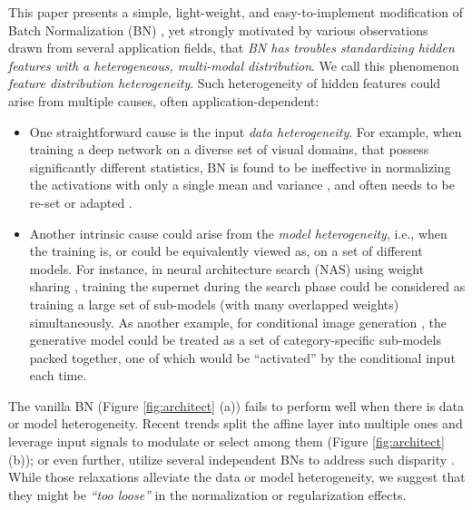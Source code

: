 \documentclass{article}
\begin{document}
This paper presents a simple, light-weight, and easy-to-implement modification of Batch Normalization (BN) \citep{ioffe2015batch}, yet strongly motivated by various observations \citep{zajkac2019split,deecke2018mode,xie2019adversarial,xie2019intriguing} drawn from several application fields, that \textit{BN has troubles standardizing hidden features with a heterogeneous, multi-modal distribution}. We call this phenomenon \textit{feature distribution heterogeneity}. Such heterogeneity of hidden features could arise from multiple causes, often application-dependent:\vspace{-1em}
\begin{itemize}[leftmargin=*]
    \item One straightforward cause is the input \textit{data heterogeneity}. For example, when training a deep network on a diverse set of visual domains, that possess significantly different statistics, BN is found to be ineffective in normalizing the activations with only a single mean and variance \citep{deecke2018mode}, and often needs to be re-set or adapted \citep{li2016revisiting}.\vspace{-0.5em}
    \item Another intrinsic cause could arise from the \textit{model heterogeneity}, i.e., when the training is, or could be equivalently viewed as, on a set of different models. For instance, in neural architecture search (NAS) using weight sharing \citep{liu2018darts,dong2019searching}, training the supernet during the search phase could be considered as training a large set of sub-models (with many overlapped weights) simultaneously. As another example, for conditional image generation \citep{miyato2018spectral}, the generative model could be treated as a set of category-specific sub-models packed together, one of which would be ``activated'' by the conditional input each time.\vspace{-1em}
\end{itemize}
The vanilla BN (Figure \ref{fig:architect} (a)) fails to perform well when there is data or model heterogeneity. Recent trends split the affine layer into multiple ones and leverage input signals to modulate or select among them \citep{de2017modulating,deecke2018mode} (Figure \ref{fig:architect} (b)); or even further, utilize several independent BNs to address such disparity \citep{zajkac2019split,xie2019adversarial,xie2019intriguing,yu2018slimmable}. While those relaxations alleviate the data or model heterogeneity, we suggest that they might be  \textit{``too loose''} in the normalization or regularization effects. 
\end{document}
